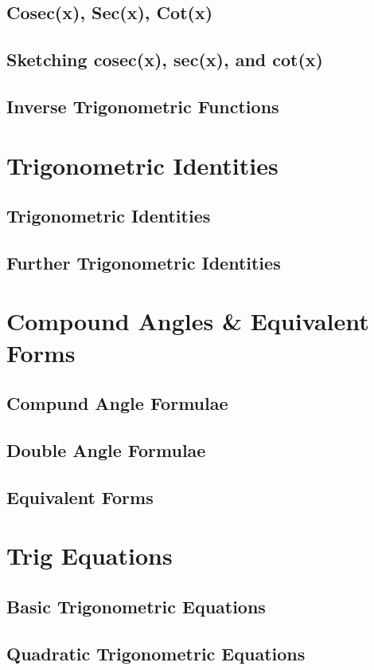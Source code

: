 \documentclass[../alevelmaths.tex]{subfiles}
\begin{document}
\subsection*{Cosec(x), Sec(x), Cot(x)}
\subsection*{Sketching cosec(x), sec(x), and cot(x)}
\subsection*{Inverse Trigonometric Functions}
\section{Trigonometric Identities}
\subsection*{Trigonometric Identities}
\subsection*{Further Trigonometric Identities}
\section{Compound Angles \& Equivalent Forms}
\subsection*{Compund Angle Formulae}
\subsection*{Double Angle Formulae}
\subsection*{Equivalent Forms}
\section{Trig Equations}
\subsection*{Basic Trigonometric Equations}
\subsection*{Quadratic Trigonometric Equations}
\end{document}

